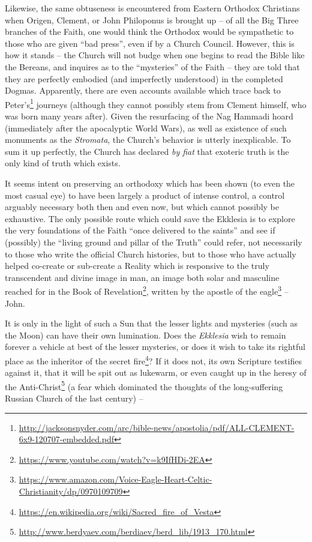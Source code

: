 Likewise, the same obtuseness is encountered from Eastern Orthodox Christians when Origen, Clement, or John Philoponus is brought up -- of all the Big Three branches of the Faith, one would think the Orthodox would be sympathetic to those who are given ``bad press'', even if by a Church Council. However, this is how it stands -- the Church will not budge when one begins to read the Bible like the Bereans, and inquires as to the ``mysteries'' of the Faith -- they are told that they are perfectly embodied (and imperfectly understood) in the completed Dogmas. Apparently, there are even accounts available which trace back to Peter's\footnote{\url{http://jacksonsnyder.com/arc/bible-news/apostolia/pdf/ALL-CLEMENT-6x9-120707-embedded.pdf}} journeys (although they cannot possibly stem from Clement himself, who was born many years after). Given the resurfacing of the Nag Hammadi hoard (immediately after the apocalyptic World Wars), as well as existence of such monuments as the \emph{Stromata}, the Church's behavior is utterly inexplicable. To sum it up perfectly, the Church has declared \emph{by fiat} that exoteric truth is the only kind of truth which exists.

It seems intent on preserving an orthodoxy which has been shown (to even the most casual eye) to have been largely a product of intense control, a control arguably necessary both then and even now, but which cannot possibly be exhaustive. The only possible route which could save the Ekklesia is to explore the very foundations of the Faith ``once delivered to the saints'' and see if (possibly) the ``living ground and pillar of the Truth'' could refer, not necessarily to those who write the official Church histories, but to those who have actually helped co-create or sub-create a Reality which is responsive to the truly transcendent and divine image in man, an image both solar and masculine reached for in the Book of Revelation\footnote{\url{https://www.youtube.com/watch?v=k9IfHDi-2EA}}, written by the apostle of the eagle\footnote{\url{https://www.amazon.com/Voice-Eagle-Heart-Celtic-Christianity/dp/0970109709}} -- John.

It is only in the light of such a Sun that the lesser lights and mysteries (such as the Moon) can have their own lumination. Does the \emph{Ekklesia} wish to remain forever a vehicle at best of the lesser mysteries, or does it wish to take its rightful place as the inheritor of the secret fire\footnote{\url{https://en.wikipedia.org/wiki/Sacred\_fire\_of\_Vesta}}? If it does not, its own Scripture testifies against it, that it will be spit out as lukewarm, or even caught up in the heresy of the Anti-Christ\footnote{\url{http://www.berdyaev.com/berdiaev/berd\_lib/1913\_170.html}} (a fear which dominated the thoughts of the long-suffering Russian Church of the last century) --


